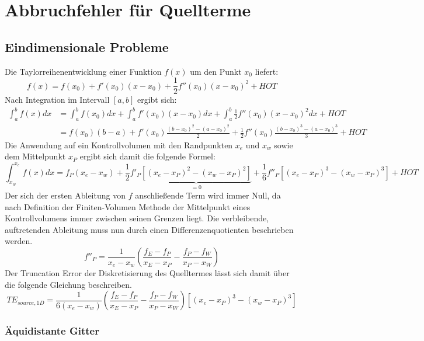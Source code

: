 \section{Abbruchfehler für Quellterme}
\label{sec:Quellterm}

\subsection{Eindimensionale Probleme}

Die Taylorreihenentwicklung einer Funktion $f(x)$ um den Punkt $x_0$
liefert:
\begin{equation*}
  f(x) = f(x_0) + f'(x_0)(x-x_0) + \frac{1}{2} f''(x_0)(x-x_0)^2 + HOT
\end{equation*}
Nach Integration im Intervall $[a, b]$ ergibt sich:
\begin{align*}
  \int_a^b f(x) dx &= \int_a^b f(x_0) dx + \int_a^b f'(x_0)(x-x_0) dx
+ \int_a^b \frac{1}{2} f''(x_0)(x-x_0)^2 dx + HOT\\
&= f(x_0) (b-a) + f'(x_0) \frac{(b-x_0)^2-(a-x_0)^2}{2}
+ \frac{1}{2} f''(x_0) \frac{(b-x_0)^3-(a-x_0)^3}{3} +HOT
\end{align*}
Die Anwendung auf ein Kontrollvolumen mit den Randpunkten $x_e$ und
$x_w$ sowie dem Mittelpunkt $x_P$ ergibt sich damit die folgende Formel:
\begin{equation*}
  \int_{x_w}^{x_e} f(x)dx = f_P(x_e-x_w)
  + \frac{1}{2} f'_P \underbrace{\left[{(x_e-x_P)^2-(x_w-x_P)^2}\right]}_{=0}
+ \frac{1}{6} f''_P \left[{{(x_e-x_P)}^3-{(x_w-x_P)}^3}\right] + HOT
\end{equation*}
Der sich der ersten Ableitung von $f$ anschließende Term wird immer Null, da nach
Definition der Finiten-Volumen Methode der Mittelpunkt eines Kontrollvolumens immer
zwischen seinen Grenzen liegt.
Die verbleibende, auftretenden Ableitung muss nun durch einen Differenzenquotienten
beschrieben werden.
\begin{equation}
  \label{eq:diskretisierung_f''P}
  f''_P = \frac{1}{x_e-x_w}\left(\frac{f_E-f_P}{x_E-x_P}-\frac{f_P-f_W}{x_P-x_W}\right)
\end{equation}
Der Truncation Error der Diskretisierung des Quelltermes lässt sich damit über die
folgende Gleichung beschreiben.
\begin{equation}
  TE_{source,1D} =
\frac{1}{6(x_e-x_w)}\left(\frac{f_E-f_P}{x_E-x_P}-\frac{f_P-f_W}{x_P-x_W}\right)
  \left[{{(x_e-x_P)}^3-{(x_w-x_P)}^3}\right]
\end{equation}

\subsubsection{Äquidistante Gitter}

